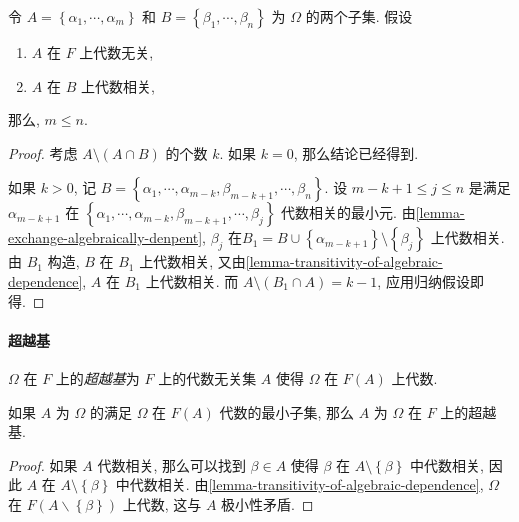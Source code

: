 \begin{theorem}[基本结果]
  \label{theorem-algebraic-dependent-fundamental-result}
  令 \( A = \left\lbrace \alpha_1, \cdots, \alpha_m \right\rbrace \) 和 \( B =
  \left\lbrace \beta_1, \cdots, \beta_n \right\rbrace \) 为 \( \Omega \)
  的两个子集.
  假设
  \begin{enumerate}
    \item \( A \) 在 \( F \) 上代数无关,
    \item \( A \) 在 \( B \) 上代数相关,
  \end{enumerate}
  那么, \( m \leq n \).
\end{theorem}
\begin{proof}
  考虑 \( A \setminus (A \cap B) \) 的个数 \( k \).
  如果 \( k = 0 \), 那么结论已经得到.

  如果 \( k > 0 \), 记 \( B = \left\lbrace \alpha_1, \cdots, \alpha_{m - k},
  \beta_{m - k + 1}, \cdots, \beta_n \right\rbrace \).
  设 \( m - k + 1 \leq j \leq n \) 是满足 \( \alpha_{m - k + 1} \) 在 \( \left\lbrace
  \alpha_1, \cdots, \alpha_{m - k}, \beta_{m - k + 1}, \cdots, \beta_j \right\rbrace \)
  代数相关的最小元.
  由\cref{lemma-exchange-algebraically-denpent}, \( \beta_j \) 在\( B_1 = B \cup
  \left\lbrace \alpha_{m - k + 1} \right\rbrace \setminus \left\lbrace \beta_{j}
  \right\rbrace \) 上代数相关.
  由 \( B_1 \) 构造, \( B \) 在 \( B_1 \) 上代数相关,
  又由\cref{lemma-transitivity-of-algebraic-dependence}, \( A \) 在 \( B_1 \)
  上代数相关.
  而 \( A \setminus (B_1 \cap A) = k - 1 \), 应用归纳假设即得.
\end{proof}

\paragraph{超越基}

\( \Omega \) 在 \( F \) 上的\emph{超越基}为 \( F \) 上的代数无关集 \( A \)
使得 \( \Omega \) 在 \( F(A) \) 上代数.

\begin{lemma}
  \label{lemma-making-algebraic-minimal-set-as-transcendence-basis}
  如果 \( A \) 为 \( \Omega \) 的满足 \( \Omega \) 在 \( F(A) \) 代数的最小子集,
  那么 \( A \) 为 \( \Omega \) 在 \( F \) 上的超越基.
\end{lemma}
\begin{proof}
  如果 \( A \) 代数相关, 那么可以找到 \( \beta \in A \) 使得 \( \beta \) 在 \( A
  \setminus \left\lbrace  \beta \right\rbrace \) 中代数相关, 因此 \( A \) 在 \(
  A \setminus \left\lbrace \beta \right\rbrace\) 中代数相关.
  由\cref{lemma-transitivity-of-algebraic-dependence}, \( \Omega \) 在 \( F(A
  \backslash \left\lbrace \beta \right\rbrace) \) 上代数, 这与 \( A \)
  极小性矛盾.
\end{proof}


